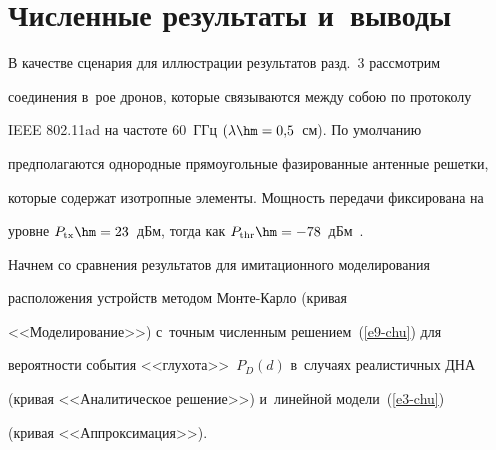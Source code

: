 \vspace*{-12pt}





\section{Численные результаты и~выводы}





\vspace*{-4pt}





  В качестве сценария для иллюстрации результатов разд.~3 рассмотрим 


соединения в~рое дронов, которые связываются между собою по протоколу 


IEEE 802.11ad на частоте 60~ГГц $(\lambda\hm=0{,}5$~см). По умолчанию 


предполагаются однородные прямоугольные фазированные антенные решетки, 


которые содержат изотропные элементы. Мощность передачи фиксирована на 


уровне $P_{\mathrm{tx}}\hm=23$~дБм, тогда как $P_{\mathrm{thr}}\hm=- 78$~дБм~\cite{7-chu}.








  


  Начнем со сравнения результатов для имитационного моделирования 


расположения устройств методом Мон\-те-Кар\-ло (кривая 


<<Моделирование>>) с~точным численным решением~(\ref{e9-chu}) для 


вероятности события <<глухота>>~$P_D(d)$ в~случаях реалистичных ДНА 


(кривая <<Аналитическое решение>>) и~линейной модели~(\ref{e3-chu}) 


(кривая <<Аппроксимация>>).


